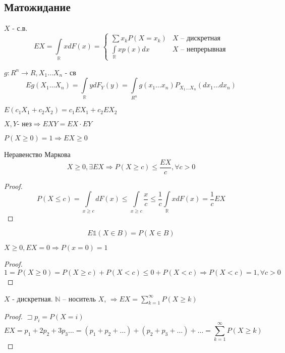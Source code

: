 \documentclass{article}
\begin{document}
    \subsection{Матожидание}
    \begin{definition}
        $X$ - с.в.
        $$ EX = \int\limits_\mathbb{R} x dF(x) = 
            \begin{cases}
                \sum x_k P(X=x_k) & X \text{ -- дискретная} \\
                \int\limits_\mathbb{R} x p(x) dx & X \text{ -- непрерывная}
            \end{cases}
        $$
    \end{definition}
    \begin{property}
        $g: R^n \to R, X_1 \dots X_n$ - св
            $$ E g(X_1\dots X_n) = \int\limits_\mathbb{R} y dF_Y(y) = \int\limits_{R^n} g(x_1\dots x_n) P_{X_1 \dots X_n} (dx_1 \dots dx_n)$$
    \end{property}
    \begin{property}
        $E(c_1X_1+c_2X_2) = c_1EX_1 +c_2EX_2$
    \end{property}
    \begin{property}
        $X, Y \textbf{- нез} \Rightarrow EXY = EX\cdot EY$
    \end{property}
    \begin{property}
        $P(X\ge0) =1 \Rightarrow EX \ge 0$
    \end{property}
    \begin{theorem}{Неравенство Маркова}
       $$ X \ge 0, \exists EX \Rightarrow P(X\ge c) \le \frac{EX}{c}, \forall c > 0 $$
        \begin{proof}
            $$ P(X\le c) = \int\limits_{x \ge c} dF(x) \le \int\limits_{x \ge c} \frac{x}{c}\le \frac{1}{c} \int\limits_\mathbb{R} x dF(x) = \frac{1}{c} EX $$
        \end{proof}
    \end{theorem}
    \begin{remark}
        $$ E \mathbb{1} (X \in B) = P(X \in B)$$
    \end{remark}
        \begin{property}
        $X \ge 0, EX=0 \Rightarrow P(x=0)=1$
        \begin{proof}
        $$ 1 = P(X \ge 0) = P(X \ge c) + P(X < c) \le 0 + P(X < c) \Rightarrow P(X < c) = 1, \forall c > 0$$
        \end{proof}
    \end{property}
    \begin{property}
        $X$ - дискретная. $\mathbb{N}$ -- носитель $X$, $\Rightarrow EX = \sum\limits_{k=1}^\infty P(X \ge k)$
        \begin{proof}
            $ \sqsupset p_i = P(X=i)$
            $$ EX = p_1 + 2 p_2 + 3 p_3 \dots = (p_1 + p_2 + \dots) + (p_2 + p_3 + \dots) + \dots = \sum\limits_{k=1}^\infty P(X\ge k)$$
        \end{proof}
    \end{property}
\end{document}
